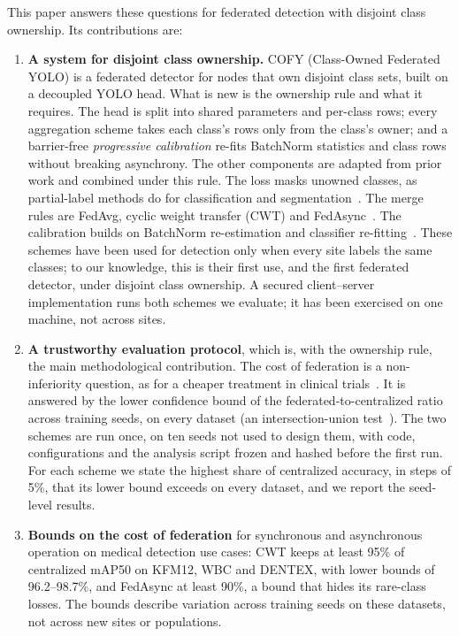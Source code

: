 \documentclass[pdflatex,sn-mathphys-num]{sn-jnl}
\newcommand{\sys}{COFY}
\begin{document}
This paper answers these questions for federated detection with disjoint class ownership. Its contributions are:
\begin{enumerate}
\item \textbf{A system for disjoint class ownership.} \sys{} (Class-Owned Federated YOLO) is a federated detector for nodes that own disjoint class sets, built on a decoupled YOLO head. What is new is the ownership rule and what it requires. The head is split into shared parameters and per-class rows; every aggregation scheme takes each class's rows only from the class's owner; and a barrier-free \emph{progressive calibration} re-fits BatchNorm statistics and class rows without breaking asynchrony. The other components are adapted from prior work and combined under this rule. The loss masks unowned classes, as partial-label methods do for classification and segmentation~\cite{li2021fedrs,xu2023fedmenu}. The merge rules are FedAvg, cyclic weight transfer (CWT) and FedAsync~\cite{mcmahan2017fedavg,chang2018distributed,xie2019fedasync}. The calibration builds on BatchNorm re-estimation and classifier re-fitting~\cite{izmailov2018swa,luo2021ccvr}. These schemes have been used for detection only when every site labels the same classes; to our knowledge, this is their first use, and the first federated detector, under disjoint class ownership. A secured client--server implementation runs both schemes we evaluate; it has been exercised on one machine, not across sites.
\item \textbf{A trustworthy evaluation protocol}, which is, with the ownership rule, the main methodological contribution. The cost of federation is a non-inferiority question, as for a cheaper treatment in clinical trials~\cite{piaggio2012consort}. It is answered by the lower confidence bound of the federated-to-centralized ratio across training seeds, on every dataset (an intersection-union test~\cite{berger1996iut}). The two schemes are run once, on ten seeds not used to design them, with code, configurations and the analysis script frozen and hashed before the first run. For each scheme we state the highest share of centralized accuracy, in steps of 5\%, that its lower bound exceeds on every dataset, and we report the seed-level results.
\item \textbf{Bounds on the cost of federation} for synchronous and asynchronous operation on medical detection use cases: CWT keeps at least 95\% of centralized mAP50 on KFM12, WBC and DENTEX, with lower bounds of 96.2--98.7\%, and FedAsync at least 90\%, a bound that hides its rare-class losses. The bounds describe variation across training seeds on these datasets, not across new sites or populations.

\end{enumerate}
\end{document}

